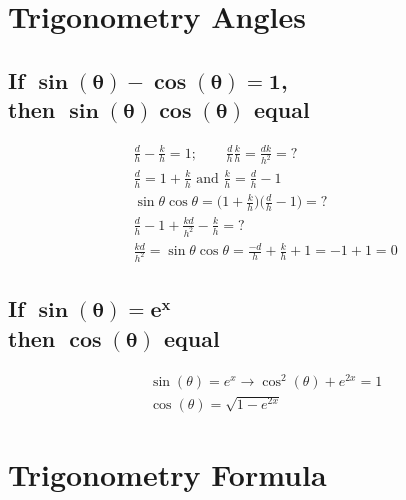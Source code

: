 \documentclass{article}
\begin{document}
\section{Trigonometry Angles}
\begin{multicols}{2}

\subsection{If $\mathbf{\sin(\theta)-\cos(\theta)=1}$, \\ then $\mathbf{\sin(\theta)\cos(\theta)}$ equal}
\begin{align*}
    &\frac{d}{h} - \frac{k}{h} = 1; \qquad \frac{d}{h}\frac{k}{h} = \frac{dk}{h^2} = ? \\
    &\frac{d}{h} = 1 + \frac{k}{h} \text{ and } \frac{k}{h}=\frac{d}{h}-1 \\
    &\sin\theta \cos\theta = \Big(1 + \frac{k}{h}\Big)\Big(\frac{d}{h}-1\Big) = ? \\
    &\frac{d}{h} - 1 + \frac{kd}{h^2} - \frac{k}{h} = ?\\
    &\frac{kd}{h^2}= \sin\theta \cos\theta = \frac{-d}{h} + \frac{k}{h}+1=-1+1=0
\end{align*}

\subsection{If $\mathbf{\sin(\theta) = e^x}$  \\ then $\mathbf{\cos(\theta)}$ equal}
\begin{align*}
    &\sin(\theta)=e^x \rightarrow \cos^2(\theta) + e^{2x} = 1 \\
    &\cos(\theta)= \sqrt{1-e^{2x}}
\end{align*}

\end{multicols}


\section{Trigonometry Formula}
\end{document}
